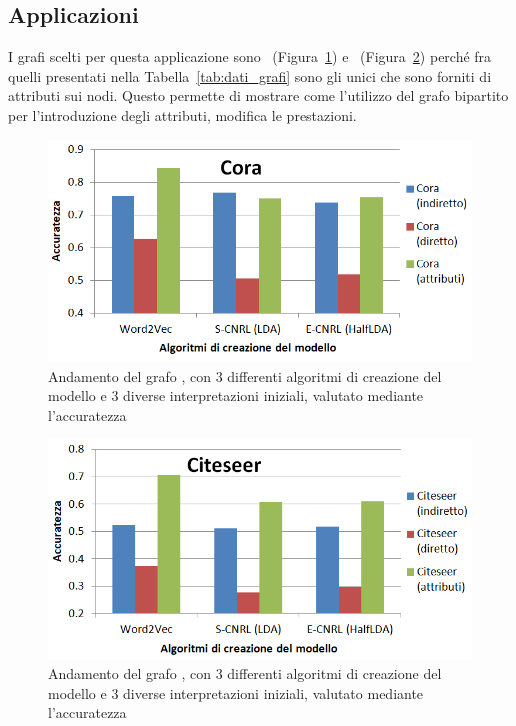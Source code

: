\subsection{Applicazioni}
I grafi scelti per questa applicazione sono \cora\ (Figura~\ref{fig:VC_cora}) e \citeseer\ (Figura~\ref{fig:VC_citeseer}) perché fra quelli presentati nella Tabella~\ref{tab:dati_grafi} sono gli unici che sono forniti di attributi sui nodi. Questo permette di mostrare come l'utilizzo del grafo bipartito per l'introduzione degli attributi, modifica le prestazioni.
%
\begin{figure}[htp]
	\centering
	\includegraphics[width=\linewidth]{immagini/VC_cora}
	\caption{Andamento del grafo \cora, con 3 differenti algoritmi di creazione del modello e 3 diverse interpretazioni iniziali, valutato mediante l'accuratezza}
	\label{fig:VC_cora}
\end{figure}
%
\begin{figure}[htp]
	\centering
	\includegraphics[width=\linewidth]{immagini/VC_citeseer}
	\caption{Andamento del grafo \citeseer, con 3 differenti algoritmi di creazione del modello e 3 diverse interpretazioni iniziali, valutato mediante l'accuratezza}
	\label{fig:VC_citeseer}
\end{figure}
